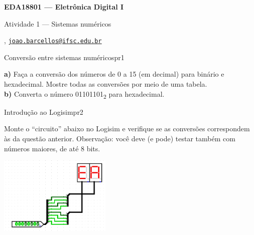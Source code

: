 



\usepackage[style=numeric, citestyle=ieee]{biblatex}




\begin{Large}
    \textbf{EDA18801 --- Eletrônica Digital I}
    
    Atividade 1 --- Sistemas numéricos \hfill {}
\end{Large}

\vspace{1ex}
\textbf{} , \href{mailto:joao.barcellos@ifsc.edu.br}{\texttt{joao.barcellos@ifsc.edu.br}}\\
\textbf{}

\vspace{2ex}

\begin{problem}{Conversão entre sistemas numéricos}{pr1}

\textbf{a)} Faça a conversão dos números de 0 a 15 (em decimal) para binário e hexadecimal. Mostre todas as conversões por meio de uma tabela. \\

\textbf{b)} Converta o número 01101101\textsubscript{2} para hexadecimal. \\

\end{problem}

\begin{problem}{Introdução ao Logisim}{pr2}

Monte o ``circuito'' abaixo no Logisim e verifique se as conversões correspondem às da questão anterior. Observação: você deve (e pode) testar também com números maiores, de até 8 bits. \\

\begin{center}
    \includegraphics[width=0.4\textwidth]{./figures/binary_to_hex_logisim.png}
\end{center}

\end{problem}

\newpage

\printbibliography


